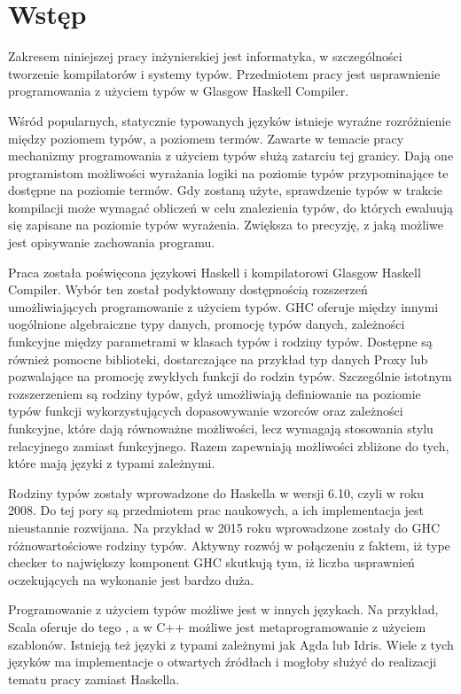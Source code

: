 \chapter{Wstęp}\label{chap:wstep}

Zakresem niniejszej pracy inżynierskiej jest informatyka, w szczególności tworzenie kompilatorów i systemy typów. Przedmiotem pracy jest usprawnienie programowania z użyciem typów w Glasgow Haskell Compiler.

Wśród popularnych, statycznie typowanych języków istnieje wyraźne rozróżnienie między poziomem typów, a poziomem termów. Zawarte w temacie pracy mechanizmy programowania z użyciem typów służą zatarciu tej granicy. Dają one programistom możliwości wyrażania logiki na poziomie typów przypominające te dostępne na poziomie termów. Gdy zostaną użyte, sprawdzenie typów w trakcie kompilacji może wymagać obliczeń w celu znalezienia typów, do których ewaluują się zapisane na poziomie typów wyrażenia. Zwiększa to precyzję, z jaką możliwe jest opisywanie zachowania programu.

Praca została poświęcona językowi Haskell i kompilatorowi Glasgow Haskell Compiler. Wybór ten został podyktowany dostępnością rozszerzeń umożliwiających programowanie z użyciem typów. GHC oferuje między innymi uogólnione algebraiczne typy danych, promocję typów danych, zależności funkcyjne między parametrami w klasach typów i rodziny typów. Dostępne są również pomocne biblioteki, dostarczające na przykład typ danych Proxy lub pozwalające na promocję zwykłych funkcji do rodzin typów. Szczególnie istotnym rozszerzeniem są rodziny typów, gdyż umożliwiają definiowanie na poziomie typów funkcji wykorzystujących dopasowywanie wzorców oraz zależności funkcyjne, które dają równoważne możliwości, lecz wymagają stosowania stylu relacyjnego zamiast funkcyjnego. Razem zapewniają możliwości zbliżone do tych, które mają języki z typami zależnymi.

Rodziny typów zostały wprowadzone do Haskella w wersji 6.10, czyli w roku 2008. Do tej pory są przedmiotem prac naukowych, a ich implementacja jest nieustannie rozwijana. Na przykład w 2015 roku wprowadzone zostały do GHC różnowartościowe rodziny typów. Aktywny rozwój w połączeniu z faktem, iż type checker to największy komponent GHC\cite{AOSA} skutkują tym, iż liczba usprawnień oczekujących na wykonanie jest bardzo duża.

Programowanie z użyciem typów możliwe jest w innych językach. Na przykład, Scala oferuje do tego , a w C++ możliwe jest metaprogramowanie z użyciem szablonów. Istnieją też języki z typami zależnymi jak Agda lub Idris. Wiele z tych języków ma implementacje o otwartych źródłach i mogłoby służyć do realizacji tematu pracy zamiast Haskella.

